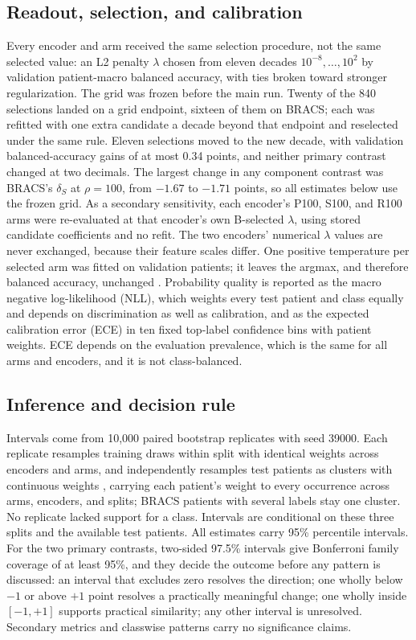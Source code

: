 \documentclass[11pt]{article}
\begin{document}
\subsection{Readout, selection, and calibration}
Every encoder and arm received the same selection procedure, not the same selected value: an L2 penalty $\lambda$ chosen from eleven decades $10^{-8},\dots,10^{2}$ by validation patient-macro balanced accuracy, with ties broken toward stronger regularization. The grid was frozen before the main run. Twenty of the 840 selections landed on a grid endpoint, sixteen of them on BRACS; each was refitted with one extra candidate a decade beyond that endpoint and reselected under the same rule. Eleven selections moved to the new decade, with validation balanced-accuracy gains of at most 0.34 points, and neither primary contrast changed at two decimals. The largest change in any component contrast was BRACS's $\delta_S$ at $\rho=100$, from $-1.67$ to $-1.71$ points, so all estimates below use the frozen grid. As a secondary sensitivity, each encoder's P100, S100, and R100 arms were re-evaluated at that encoder's own B-selected $\lambda$, using stored candidate coefficients and no refit. The two encoders' numerical $\lambda$ values are never exchanged, because their feature scales differ. One positive temperature per selected arm was fitted on validation patients; it leaves the argmax, and therefore balanced accuracy, unchanged \citep{guo2017calibration}. Probability quality is reported as the macro negative log-likelihood (NLL), which weights every test patient and class equally and depends on discrimination as well as calibration, and as the expected calibration error (ECE) in ten fixed top-label confidence bins with patient weights. ECE depends on the evaluation prevalence, which is the same for all arms and encoders, and it is not class-balanced.

\subsection{Inference and decision rule}
Intervals come from 10,000 paired bootstrap replicates with seed 39000. Each replicate resamples training draws within split with identical weights across encoders and arms, and independently resamples test patients as clusters with continuous weights \citep{rubin1981bayesian}, carrying each patient's weight to every occurrence across arms, encoders, and splits; BRACS patients with several labels stay one cluster. No replicate lacked support for a class. Intervals are conditional on these three splits and the available test patients. All estimates carry 95\% percentile intervals. For the two primary contrasts, two-sided 97.5\% intervals give Bonferroni family coverage of at least 95\%, and they decide the outcome before any pattern is discussed: an interval that excludes zero resolves the direction; one wholly below $-1$ or above $+1$ point resolves a practically meaningful change; one wholly inside $[-1,+1]$ supports practical similarity; any other interval is unresolved. Secondary metrics and classwise patterns carry no significance claims.






\appendix

\end{document}
